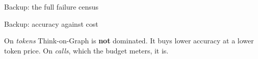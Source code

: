 \begin{frame}{Backup: the full failure census}
  \bodyshift{3pt}
  \centering
  \resizebox{\textwidth}{!}{%
    }
  \centrebody
\end{frame}

\begin{frame}{Backup: accuracy against cost}
  \centering
  {%
   }

  \vspace{1mm}
  {\small On \emph{tokens} Think-on-Graph is \textbf{not} dominated. It buys
  lower accuracy at a lower token price. On \emph{calls}, which the budget
  meters, it is.\par}
\end{frame}

